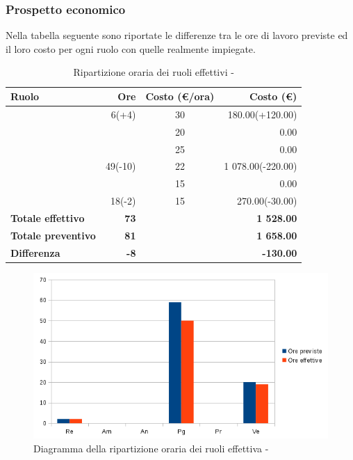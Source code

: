 \documentclass[12pt,a4paper]{article}
\begin{document}
\subsubsection{Prospetto economico}
Nella tabella seguente sono riportate le differenze tra le ore di lavoro previste ed il loro costo per ogni ruolo con quelle realmente impiegate.

\begin{table}[H]
	\begin{center}
		\begin{tabular}{l r c r}
			\toprule
			\textbf{Ruolo}	& \textbf{Ore} & \textbf{Costo (\euro/ora)}	& \textbf{Costo (\euro)} \\ \midrule
			\midrule
            \RE{} & 6(+4) & 30 & 180.00(+120.00) \\ \midrule
			\AM{} & & 20 & 0.00 \\ \midrule
			\AN{} & & 25 & 0.00 \\ \midrule
            \PG{} & 49(-10) & 22 & 1 078.00(-220.00) \\ \midrule
			\PR{} & & 15 & 0.00 \\ \midrule
            \VR{} & 18(-2) & 15 & 270.00(-30.00) \\ \midrule
            \textbf{Totale effettivo} & \textbf{73} &  & \textbf{1 528.00} \\ \midrule
			\textbf{Totale preventivo} & \textbf{81} &  & \textbf{1 658.00} \\ \midrule
			\textbf{Differenza} & \textbf{-8} &  & \textbf{-130.00} \\ \midrule
			\bottomrule
		\end{tabular}
		\caption{Ripartizione oraria dei ruoli effettivi - \FPA{}}
	\end{center}
\end{table}

\begin{center}
	\begin{figure}[H]
		\centering
		\includegraphics[width=\textwidth]{../img/diagrammaBarreProgettazioneArchitetturaleConsuntivo.png}
		\caption{Diagramma della ripartizione oraria dei ruoli effettiva - \FA{}}
	\end{figure}
\end{center}
\end{document}
